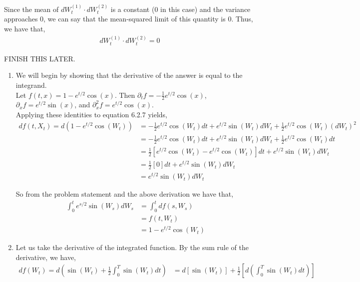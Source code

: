 \documentclass[12pt]{article}
\newenvironment{problem}[2][Problem]{\begin{trivlist}
\item[\hskip \labelsep {\bfseries #1}\hskip \labelsep {\bfseries #2.}]}{\end{trivlist}}
\begin{document}
Since the mean of $dW_t^{(1)} \cdot dW_t^{(2)}$ is a constant (0 in this case) and the variance approaches 0, we can say that the mean-squared limit of this quantity is 0. Thus, we have that,
\begin{align*}
dW_t^{(1)} \cdot dW_t^{(2)} = 0
\end{align*}

\begin{problem}{22}
\end{problem}

FINISH THIS LATER.

\begin{problem}{23}
\end{problem}

\begin{enumerate}[\alph*)]

\item We will begin by showing that the derivative of the answer is equal to the integrand.\\

Let $f(t,x) = 1 - e^{t/2}\cos(x)$. Then $\partial_t f = -\frac{1}{2}e^{t/2}\cos(x)$, $\partial_x f = e^{t/2}\sin(x)$, and $\partial^2_x f = e^{t/2}\cos(x)$.\\

Applying these identities to equation 6.2.7 yields,
\begin{align*}
df(t, X_t) = d(1 - e^{t/2}\cos(W_t)) &= -\frac{1}{2}e^{t/2}\cos(W_t)dt + e^{t/2}\sin(W_t)dW_t + \frac{1}{2}e^{t/2}\cos(W_t)(dW_t)^2\\
&= -\frac{1}{2}e^{t/2}\cos(W_t)dt + e^{t/2}\sin(W_t)dW_t + \frac{1}{2}e^{t/2}\cos(W_t)dt\\
&= \frac{1}{2}\left[e^{t/2}\cos(W_t) - e^{t/2}\cos(W_t)\right]dt + e^{t/2}\sin(W_t)dW_t\\
&= \frac{1}{2}[0]dt + e^{t/2}\sin(W_t)dW_t\\
&= e^{t/2}\sin(W_t)dW_t
\end{align*}

So from the problem statement and the above derivation we have that,
\begin{align*}
\int_0^t e^{s/2}\sin(W_s)dW_s &= \int_0^t df(s, W_s)\\
&= f(t, W_t)\\
&= 1 - e^{t/2}\cos(W_t)
\end{align*}

\item Let us take the derivative of the integrated function. By the sum rule of the derivative, we have,
\begin{align*}
d f(W_t) = d\left(\sin(W_t) + \frac{1}{2} \int_0^T \sin(W_t) dt\right) &= d\left[\sin(W_t)\right] + \frac{1}{2} \left[ d\left(\int_0^T \sin(W_t)dt\right) \right]\\
\end{align*}


\end{enumerate}
\end{document}
